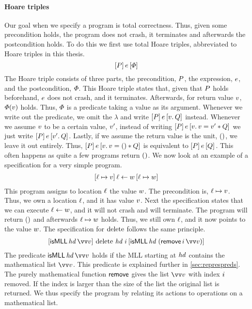 \documentclass[thesis.tex]{subfiles}
\begin{document}
\paragraph{Hoare triples}
Our goal when we specify a program is total correctness. Thus, given some precondition holds, the program does not crash, it terminates and afterwards the postcondition holds. To do this we first use total Hoare triples, abbreviated to Hoare triples in this thesis.
\[\hoare{\prop}{\expr}{\pred}\]
The Hoare triple consists of three parts, the precondition, $P$, the expression, $e$, and the postcondition, $\varPhi$. This Hoare triple states that, given that $P$ holds beforehand, $e$ does not crash, and it terminates. Afterwards, for return value $v$,  $\varPhi(v)$ holds. Thus, $\varPhi$ is a predicate taking a value as its argument. Whenever we write out the predicate, we omit the $\lambda$ and write $\hoare{\prop}{\expr}{\Ret\val. \propB}$ instead. Whenever we assume $v$ to be a certain value, $v'$, instead of writing $\hoare{\prop}\expr{\Ret\val. \val = \val' * \propB}$ we just write $\hoare{\prop}\expr{\Ret\val'. \propB}$. Lastly, if we assume the return value is the unit, $()$, we leave it out entirely. Thus, $\hoare{\prop}\expr{\Ret\val. \val = \TT * \propB}$ is equivalent to $\hoare{\prop}\expr{\propB}$. This often happens as quite a few programs return $()$. We now look at an example of a specification for a very simple program.
\begin{align*}
    \hoare{\loc\fmapsto\val}{\loc\gets\valB}{\loc\fmapsto\valB}
\end{align*}
This program assigns to location $\ell$ the value $w$. The precondition is, $\loc\fmapsto\val$. Thus, we own a location $\ell$, and it has value $v$. Next the specification states that we can execute $\ell\leftarrow w$, and it will not crash and will terminate. The program will return $()$ and afterwards $\loc\fmapsto\valB$ holds. Thus, we still own $\ell$, and it now points to the value $w$. The specification for $\operatorname{delete}$ follows the same principle.
\begin{align*}
    \hoare{\isMLL\, \hd\, \vect{\val}}{\MLLdelete\, \hd\; \iindex }{\isMLL\, \hd\; (\textlog{remove}\, \iindex\, \vect{\val})}
\end{align*}
The predicate $\isMLL\, \hd\, \vect{\val}$ holds if the MLL starting at $\mathit{hd}$ contains the mathematical list $\vect{\val}$. This predicate is explained further in \cref{sec:represpreds}. The purely mathematical function $\textsf{\upshape remove}$ gives the list $\vect{\val}$ with index $i$ removed. If the index is larger than the size of the list the original list is returned. We thus specify the program by relating its actions to operations on a mathematical list.
\end{document}
